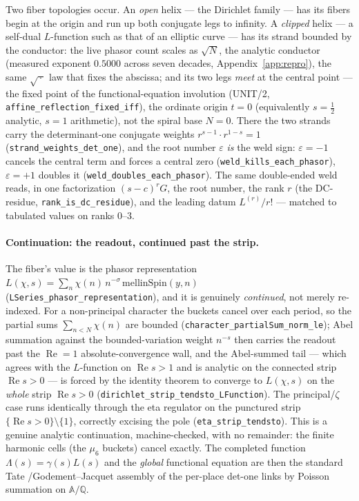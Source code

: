\documentclass[11pt]{article}
\theoremstyle{definition}
\renewcommand{\Re}{\operatorname{Re}}
\begin{document}
Two fiber topologies occur. An \emph{open} helix --- the Dirichlet family --- has its fibers begin at
the origin and run up both conjugate legs to infinity. A \emph{clipped} helix --- a self-dual
$L$-function such as that of an elliptic curve --- has its strand bounded by the conductor: the live
phasor count scales as $\sqrt N$, the analytic conductor (measured exponent $0.5000$ across seven
decades, Appendix~\ref{app:repro}), the same $\sqrt{\,\cdot\,}$ law that fixes the abscissa; and its
two legs \emph{meet} at the central point --- the fixed point of the functional-equation involution
(UNIT/2, \texttt{affine\_reflection\_fixed\_iff}), the ordinate origin $t=0$ (equivalently
$s=\tfrac12$ analytic, $s=1$ arithmetic), not the spiral base $N=0$. There the two strands carry the
determinant-one conjugate weights $r^{s-1}\!\cdot r^{1-s}=1$ (\texttt{strand\_weights\_det\_one}), and
the root number $\varepsilon$ \emph{is} the weld sign: $\varepsilon=-1$ cancels the central term and
forces a central zero (\texttt{weld\_kills\_each\_phasor}), $\varepsilon=+1$ doubles it
(\texttt{weld\_doubles\_each\_phasor}). The same double-ended weld reads, in one factorization
$(s-c)^r G$, the root number, the rank $r$ (the DC-residue, \texttt{rank\_is\_dc\_residue}), and the
leading datum $L^{(r)}/r!$ --- matched to tabulated values on ranks $0$–$3$.

\paragraph{Continuation: the readout, continued past the strip.} The fiber's value is the phasor
representation $L(\chi,s)=\sum_n\chi(n)\,n^{-\sigma}\,\mathrm{mellinSpin}(y,n)$
(\texttt{LSeries\_phasor\_representation}), and it is genuinely \emph{continued}, not merely
re-indexed. For a non-principal character the buckets cancel over each period, so the partial sums
$\sum_{n<N}\chi(n)$ are bounded (\texttt{character\_partialSum\_norm\_le}); Abel summation against the
bounded-variation weight $n^{-s}$ then carries the readout past the $\Re=1$ absolute-convergence wall,
and the Abel-summed tail --- which agrees with the $L$-function on $\Re s>1$ and is analytic on the
connected strip $\Re s>0$ --- is forced by the identity theorem to converge to $L(\chi,s)$ on the
\emph{whole} strip $\Re s>0$ (\texttt{dirichlet\_strip\_tendsto\_LFunction}). The principal/$\zeta$
case runs identically through the eta regulator on the punctured strip $\{\Re s>0\}\setminus\{1\}$,
correctly excising the pole (\texttt{eta\_strip\_tendsto}). This is a genuine analytic continuation,
machine-checked, with no remainder: the finite harmonic cells (the $\mu_6$ buckets) cancel exactly.
The completed function $\Lambda(s)=\gamma(s)L(s)$ and the \emph{global} functional equation are then
the standard Tate \cite{Tate}/Godement--Jacquet \cite{GJa} assembly of the per-place det-one links by
Poisson summation on $\mathbb A/\mathbb Q$.
\end{document}
